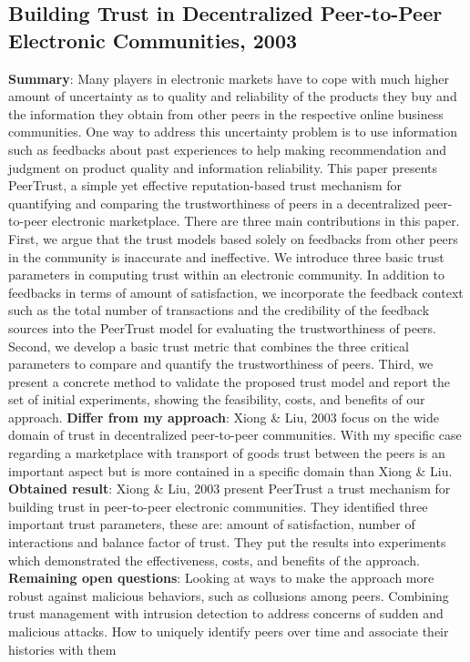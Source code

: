 \documentclass[11pt]{article}
\begin{document}
\subsection{Building Trust in Decentralized Peer-to-Peer Electronic Communities, 2003 \cite{buildTrust}}
\textbf{Summary}: Many players in electronic markets have to cope with much higher amount of uncertainty as to quality and reliability of the products they buy and the information they obtain from other peers in the respective online business communities. One way to address this uncertainty problem is to use information such as feedbacks about past experiences to help making recommendation and judgment on product quality and information reliability. This paper presents PeerTrust, a simple yet effective reputation-based trust mechanism for quantifying and comparing the trustworthiness of peers in a decentralized peer-to-peer electronic marketplace. There are three main contributions in this paper. First, we argue that the trust models based solely on feedbacks from other peers in the community is inaccurate and ineffective. We introduce three basic trust parameters in computing trust within an electronic community. In addition to feedbacks in terms of amount of satisfaction, we incorporate the feedback context such as the total number of transactions and the credibility of the feedback sources into the PeerTrust model for evaluating the trustworthiness of peers. Second, we develop a basic trust metric that combines the three critical parameters to compare and quantify the trustworthiness of peers. Third, we present a concrete method to validate the proposed trust model and report the set of initial experiments, showing the feasibility, costs, and benefits of our approach.\newline
\textbf{Differ from my approach}: Xiong \& Liu, 2003 focus on the wide domain of trust in decentralized peer-to-peer communities. With my specific case regarding a marketplace with transport of goods trust between the peers is an important aspect but is more contained in a specific domain than Xiong \& Liu.\newline
\textbf{Obtained result}: Xiong \& Liu, 2003 present PeerTrust a trust mechanism for building trust in peer-to-peer electronic communities. They identified three important trust parameters, these are: amount of satisfaction, number of interactions and balance factor of trust. They put the results into experiments which demonstrated the effectiveness, costs, and benefits of the approach.\newline
\textbf{Remaining open questions}: Looking at ways to make the approach more robust against malicious behaviors, such as collusions among peers. Combining trust management with intrusion detection to address concerns of sudden and malicious attacks. How to uniquely identify peers over time and associate their histories with them\newline
\end{document}
